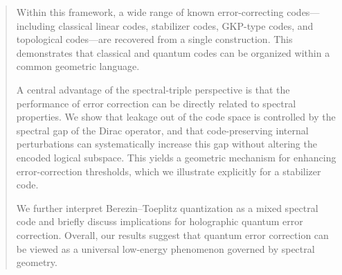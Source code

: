 \documentclass[12pt]{article}
\theoremstyle{definition} %
\theoremstyle{plain} %
\theoremstyle{remark} %
\theoremstyle{underline}
\begin{document}
\begin{titlepage}
\begin{abstract}
Within this framework, a wide range of known error-correcting codes—including classical linear codes, stabilizer codes, GKP-type codes, and topological codes—are recovered from a single construction. This demonstrates that classical and quantum codes can be organized within a common geometric language.

A central advantage of the spectral-triple perspective is that the performance of error correction can be directly related to spectral properties. We show that leakage out of the code space is controlled by the spectral gap of the Dirac operator, and that code-preserving internal perturbations can systematically increase this gap without altering the encoded logical subspace. This yields a geometric mechanism for enhancing error-correction thresholds, which we illustrate explicitly for a stabilizer code.

We further interpret Berezin–Toeplitz quantization as a mixed spectral code and briefly discuss implications for holographic quantum error correction. Overall, our results suggest that quantum error correction can be viewed as a universal low-energy phenomenon governed by spectral geometry.

\end{abstract}

\end{titlepage}

\tableofcontents
\newpage


\end{document}
